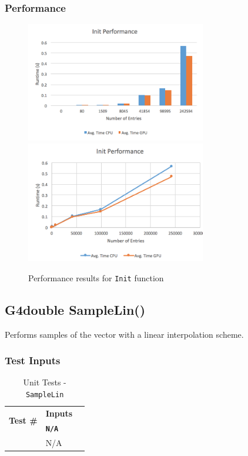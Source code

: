 \documentclass[12pt]{article}
\newcounter{TestCounter}
\begin{document}
	\subsubsection{Performance}
    	\begin{figure}[H]
    	\centering
    	\caption{Performance results for \texttt{Init} function}\label{figPerformanceInit}
    	\includegraphics[width=0.7\textwidth]{init_bar.png}
    	\includegraphics[width=0.7\textwidth]{init_line.png}
    	\end{figure}

\subsection{G4double SampleLin()}%
	
	 Performs samples of the vector with a linear interpolation scheme.
	
	\subsubsection{Test Inputs}
		\begin{table}[H]
		\centering
		\caption{Unit Tests - \texttt{SampleLin}}\label{SampleLin_unit}
		\begin{tabular}{lll}
		\toprule
		\multirow{2}{*}{\bf Test \#}  & \multicolumn{1}{c}{\bf Inputs}\\
		& \bf \texttt{N/A}\\\midrule
		{TestCounter}\arabic{TestCounter}\label{SampleLin_0} & N/A \\
		\bottomrule
		\end{tabular}
		\end{table}
	
\end{document}
